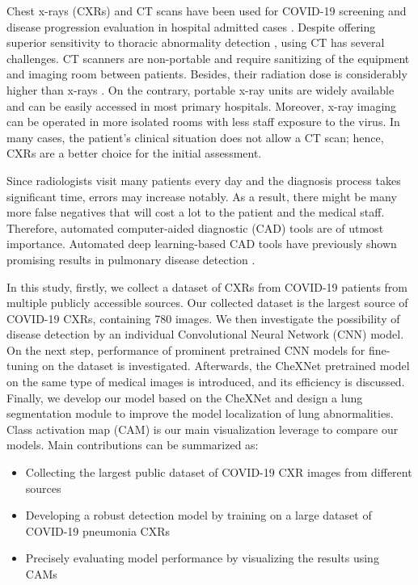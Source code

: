 \documentclass{article}
\newcommand\numOfImages{780}
\begin{document}
Chest x-rays (CXRs) and CT scans have been used for COVID-19 screening and disease progression evaluation in hospital admitted cases \cite{rubin2020role}. Despite offering superior sensitivity to thoracic abnormality detection \cite{cellina2020false}, using CT has several challenges. CT scanners are non-portable and require sanitizing of the equipment and imaging room between patients. Besides, their radiation dose is considerably higher than x-rays \cite{furlow2010radiation}. On the contrary, portable x-ray units are widely available and can be easily accessed in most primary hospitals. Moreover, x-ray imaging can be operated in more isolated rooms with less staff exposure to the virus. In many cases, the patient's clinical situation does not allow a CT scan; hence, CXRs are a better choice for the initial assessment.

Since radiologists visit many patients every day and the diagnosis process takes significant time, errors may increase notably. As a result, there might be many more false negatives that will cost a lot to the patient and the medical staff. Therefore, automated computer-aided diagnostic (CAD) tools are of utmost importance. Automated deep learning-based CAD tools have previously shown promising results in pulmonary disease detection \cite{lakhani2017deep}. 





In this study, firstly, we collect a dataset of CXRs from COVID-19 patients from multiple publicly accessible sources. Our collected dataset is the largest source of COVID-19 CXRs, containing \numOfImages{} images. We then investigate the possibility of disease detection by an individual Convolutional Neural Network (CNN) model. On the next step, performance of prominent pretrained CNN models for fine-tuning on the dataset is investigated. Afterwards, the CheXNet pretrained model on the same type of medical images is introduced, and its efficiency is discussed. Finally, we develop our model based on the CheXNet and design a lung segmentation module to improve the model localization of lung abnormalities. Class activation map (CAM) is our main visualization leverage to compare our models. Main contributions can be summarized as:

\begin{itemize}
    \item Collecting the largest public dataset of COVID-19 CXR images from different sources
    \item Developing a robust detection model by training on a large dataset of COVID-19 pneumonia CXRs
    \item Precisely evaluating model performance by visualizing the results using CAMs
\end{itemize}
\end{document}
